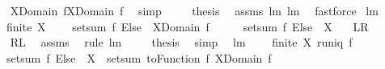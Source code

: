 \begin{isabellebody}
\ \ \isamarkupfalse%
\ {\isachardoublequoteopen}X{\isasyminter}Domain\ f{\isacharequal}X{\isacharminus}{\isacharparenleft}{\isacharminus}Domain\ f{\isacharparenright}{\isachardoublequoteclose}\ \isamarkupfalse%
\ simp\ \isanewline
\ \ \isamarkupfalse%
\ {\isacharquery}thesis\ \isamarkupfalse%
\ assms\ lm{}{}{}\ lm{}{}{}\ \isamarkupfalse%
\ fastforce\isanewline
{}\isamarkupfalse%
%
\endisatagproof
{\isafoldproof}%
%
\isadelimproof
\isanewline
%
\endisadelimproof
\isanewline
{}\isamarkupfalse%
\ lm{}{}{}{\isacharcolon}\ \isanewline
\ \ \ {\isachardoublequoteopen}finite\ X{\isachardoublequoteclose}\ \isanewline
\ \ \ {\isachardoublequoteopen}setsum\ {\isacharparenleft}f\ Else\ {}{\isacharparenright}\ {\isacharparenleft}X{\isasyminter}Domain\ f{\isacharparenright}\ \ \ {\isacharequal}\ \ \ setsum\ {\isacharparenleft}f\ Else\ {}{\isacharparenright}\ X{\isachardoublequoteclose}\isanewline
\ \ {\isacharparenleft}\ {\isachardoublequoteopen}{\isacharquery}L{\isacharequal}{\isacharquery}R{\isachardoublequoteclose}{\isacharparenright}\ \isanewline
%
\isadelimproof
%
\endisadelimproof
%
\isatagproof
{}\isamarkupfalse%
\ {\isacharminus}\ \isanewline
\ \ \isamarkupfalse%
\ {\isachardoublequoteopen}{\isacharquery}R{\isacharequal}{\isacharquery}L{\isachardoublequoteclose}\ \isamarkupfalse%
\ assms\ \isamarkupfalse%
\ {\isacharparenleft}rule\ lm{}{}{}{\isacharparenright}\ \isanewline
\ \ \isamarkupfalse%
\ {\isacharquery}thesis\ \isamarkupfalse%
\ simp\ \isanewline
{}\isamarkupfalse%
%
\endisatagproof
{\isafoldproof}%
%
\isadelimproof
\isanewline
%
\endisadelimproof
\isanewline
{}\isamarkupfalse%
\ lm{}{}{}{\isacharcolon}\ \isanewline
\ \ \ {\isachardoublequoteopen}finite\ X{\isachardoublequoteclose}\ {\isachardoublequoteopen}runiq\ f{\isachardoublequoteclose}\ \isanewline
\ \ \ {\isachardoublequoteopen}setsum\ {\isacharparenleft}f\ Else\ {}{\isacharparenright}\ X\ {\isacharequal}\ setsum\ {\isacharparenleft}toFunction\ f{\isacharparenright}\ {\isacharparenleft}X{\isasyminter}Domain\ f{\isacharparenright}{\isachardoublequoteclose}\ \isanewline

\end{isabellebody}
